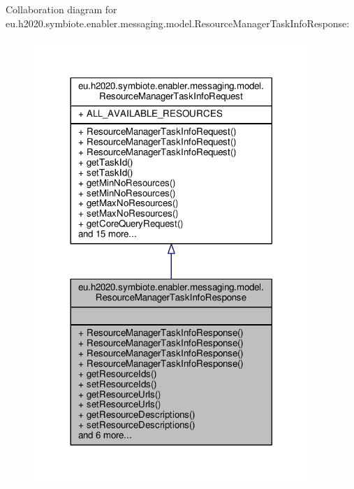 Collaboration diagram for eu.\+h2020.\+symbiote.\+enabler.\+messaging.\+model.\+Resource\+Manager\+Task\+Info\+Response\+:\nopagebreak
\begin{figure}[H]
\begin{center}
\leavevmode
\includegraphics[width=296pt]{classeu_1_1h2020_1_1symbiote_1_1enabler_1_1messaging_1_1model_1_1ResourceManagerTaskInfoResponse__coll__graph}
\end{center}
\end{figure}
